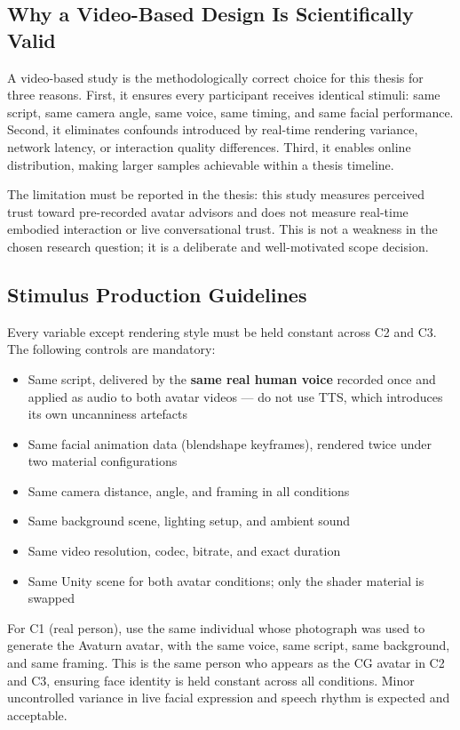 \documentclass[11pt, a4paper]{article}
\begin{document}
\subsection{Why a Video-Based Design Is Scientifically Valid}

A video-based study is the methodologically correct choice for this thesis for three reasons. First, it ensures every participant receives identical stimuli: same script, same camera angle, same voice, same timing, and same facial performance. Second, it eliminates confounds introduced by real-time rendering variance, network latency, or interaction quality differences. Third, it enables online distribution, making larger samples achievable within a thesis timeline.

The limitation must be reported in the thesis: this study measures perceived trust toward pre-recorded avatar advisors and does not measure real-time embodied interaction or live conversational trust. This is not a weakness in the chosen research question; it is a deliberate and well-motivated scope decision.

\subsection{Stimulus Production Guidelines}

Every variable except rendering style must be held constant across C2 and C3. The following controls are mandatory:

\begin{itemize}
  \item Same script, delivered by the \textbf{same real human voice} recorded once and applied as audio to both avatar videos — do not use TTS, which introduces its own uncanniness artefacts
  \item Same facial animation data (blendshape keyframes), rendered twice under two material configurations
  \item Same camera distance, angle, and framing in all conditions
  \item Same background scene, lighting setup, and ambient sound
  \item Same video resolution, codec, bitrate, and exact duration
  \item Same Unity scene for both avatar conditions; only the shader material is swapped
\end{itemize}

For C1 (real person), use the same individual whose photograph was used to generate the Avaturn avatar, with the same voice, same script, same background, and same framing. This is the same person who appears as the CG avatar in C2 and C3, ensuring face identity is held constant across all conditions. Minor uncontrolled variance in live facial expression and speech rhythm is expected and acceptable.
\end{document}
